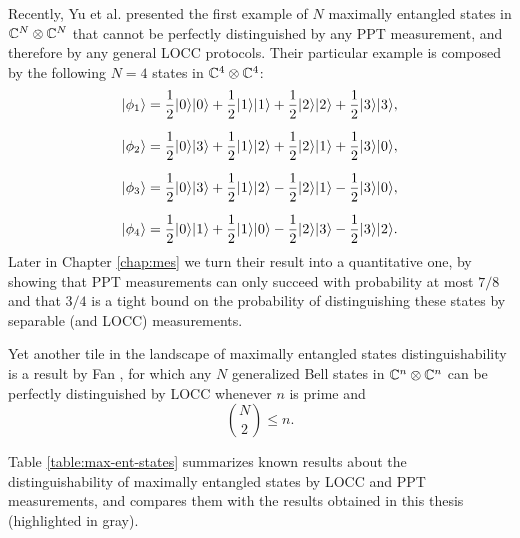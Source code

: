 Recently, Yu et al. \cite{Yu12} presented the first example of $N$ maximally 
entangled states in $\mathbb{C}^{N}\otimes\mathbb{C}^{N}$ that cannot be 
perfectly distinguished by any PPT measurement, and therefore by any general 
LOCC protocols.
Their particular example is composed by the following $N = 4$ states in 
$\mathbb{C}^{4}\otimes\mathbb{C}^{4}$:
\begin{equation}
  \label{eq:ydy_states}
  \begin{aligned}
    \ket{\phi_1} & =
    \frac{1}{2} \ket{0}\ket{0} + 
    \frac{1}{2} \ket{1}\ket{1} + 
    \frac{1}{2} \ket{2}\ket{2} + 
    \frac{1}{2} \ket{3}\ket{3}, \\[2mm]
    \ket{\phi_2} & =
    \frac{1}{2} \ket{0}\ket{3} + 
    \frac{1}{2} \ket{1}\ket{2} + 
    \frac{1}{2} \ket{2}\ket{1} + 
    \frac{1}{2} \ket{3}\ket{0}, \\[2mm]
    \ket{\phi_3} & =
    \frac{1}{2} \ket{0}\ket{3} +
    \frac{1}{2} \ket{1}\ket{2} - 
    \frac{1}{2} \ket{2}\ket{1} - 
    \frac{1}{2} \ket{3}\ket{0}, \\[2mm]
    \ket{\phi_4} & =
    \frac{1}{2} \ket{0}\ket{1} + 
    \frac{1}{2} \ket{1}\ket{0} -
    \frac{1}{2} \ket{2}\ket{3} - 
    \frac{1}{2} \ket{3}\ket{2}.
  \end{aligned}
\end{equation}
Later in Chapter \ref{chap:mes} we turn their result into a quantitative one,
by showing that PPT measurements can only succeed with probability at most $7/8$
and that $3/4$ is a tight bound on the probability of distinguishing these states 
by separable (and LOCC) measurements.

Yet another tile in the landscape of maximally entangled states distinguishability
is a result by Fan \cite{Fan04}, for which any $N$ generalized 
Bell states in $\mathbb{C}^{n}\otimes\mathbb{C}^{n}$ can be perfectly distinguished 
by LOCC whenever $n$ is prime and 
\[ 
  \binom{N}{2}\leq n.
\]

Table \ref{table:max-ent-states} summarizes known results about the
distinguishability of maximally entangled states by LOCC and PPT 
measurements, and compares them with the results obtained in this thesis 
(highlighted in gray). 

